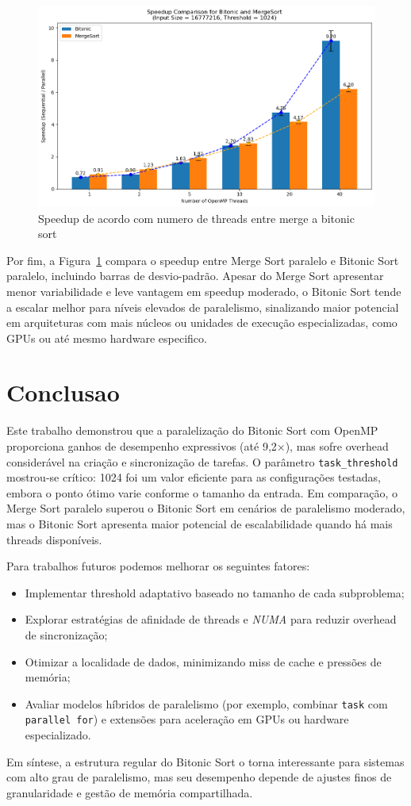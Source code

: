 \documentclass{article}
\begin{document}
\begin{figure}[H]
    \centering
    \includegraphics[width=0.8\linewidth]{images/speedup.png}
    \caption{Speedup de acordo com numero de threads entre merge a bitonic sort}
    \label{fig:speedup}
\end{figure}

Por fim, a Figura~\ref{fig:speedup} compara o speedup entre Merge Sort paralelo e Bitonic Sort paralelo, incluindo barras de desvio-padrão. Apesar do Merge Sort apresentar menor variabilidade e leve vantagem em speedup moderado, o Bitonic Sort tende a escalar melhor para níveis elevados de paralelismo, sinalizando maior potencial em arquiteturas com mais núcleos ou unidades de execução especializadas, como GPUs ou até mesmo hardware especifico.

\section{Conclusao}

Este trabalho demonstrou que a paralelização do Bitonic Sort com OpenMP proporciona ganhos de desempenho expressivos (até 9,2×), mas sofre overhead considerável na criação e sincronização de tarefas. O parâmetro \texttt{task\_threshold} mostrou-se crítico: 1024 foi um valor eficiente para as configurações testadas, embora o ponto ótimo varie conforme o tamanho da entrada. Em comparação, o Merge Sort paralelo superou o Bitonic Sort em cenários de paralelismo moderado, mas o Bitonic Sort apresenta maior potencial de escalabilidade quando há mais threads disponíveis.

Para trabalhos futuros podemos melhorar os seguintes fatores:
\begin{itemize}
  \item Implementar threshold adaptativo baseado no tamanho de cada subproblema;
  \item Explorar estratégias de afinidade de threads e \emph{NUMA} para reduzir overhead de sincronização;
  \item Otimizar a localidade de dados, minimizando miss de cache e pressões de memória;
  \item Avaliar modelos híbridos de paralelismo (por exemplo, combinar \texttt{task} com \texttt{parallel for}) e extensões para aceleração em GPUs ou hardware especializado.
\end{itemize}

Em síntese, a estrutura regular do Bitonic Sort o torna interessante para sistemas com alto grau de paralelismo, mas seu desempenho depende de ajustes finos de granularidade e gestão de memória compartilhada.

\printbibliography
\end{document}
